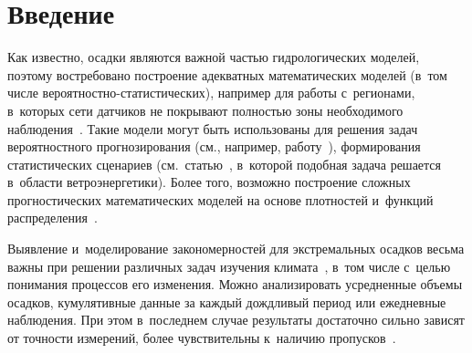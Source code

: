 
\vspace*{19pt}


\thispagestyle{headings}

\begin{multicols}{2}

\label{st\stat}


\section{Введение}

Как известно, осадки являются важной частью гидрологических моделей, поэтому
востребовано построение адекватных математических моделей (в~том
числе ве\-ро\-ят\-ност\-но-ста\-ти\-сти\-че\-ских), например для работы 
с~регионами, в~которых сети датчиков не покрывают полностью зоны
необходимого наблюдения~\cite{Strauch2012}. Такие модели могут быть
использованы для решения задач вероятностного
прогнозирования (см., например, работу~\cite{Krzysztofowicz2001}), формирования
статистических сценариев (см.\ статью~\cite{Pinson2009}, в~которой подобная
задача решается в~области ветроэнергетики). Более того, возможно построение
сложных прогностических математических моделей на основе плотностей 
и~функций распределения~\cite{Gneiting2007}.
{

}

Выявление и~моделирование закономерностей для экстремальных осадков
весьма важны при решении различных задач изучения климата~\cite{Kharin2007}, 
в~том числе с~целью понимания процессов его изменения. Можно анализировать
усредненные объемы осадков, кумулятивные данные за каждый дождливый период
или ежедневные наблюдения. При этом в~последнем случае результаты достаточно
сильно зависят от точности измерений, более чувствительны к~наличию
пропусков~\cite{Zolina2005}.

\begin{figure*}[b] %
      \vspace*{1pt}
 \begin{center}
 \mbox{%
 \epsfxsize=120.85mm 
 }
\end{center}
\vspace*{-11pt}
\end{figure*}


\end{multicols}
